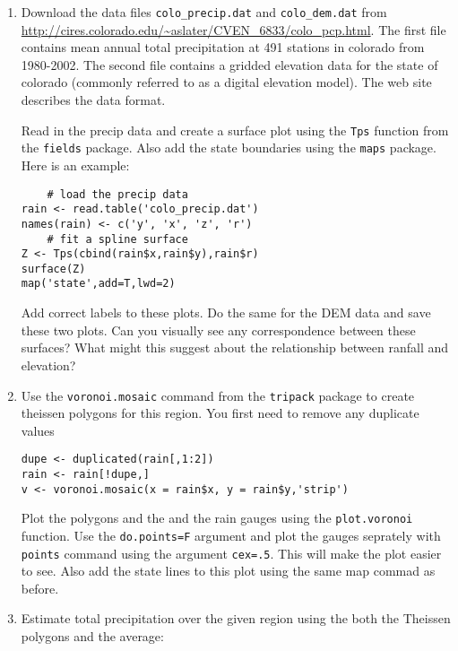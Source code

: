 \documentclass[11pt]{article}
\begin{document}
\begin{enumerate}

\item Download the data files \texttt{colo\_precip.dat} and \texttt{colo\_dem.dat} from \url{http://cires.colorado.edu/~aslater/CVEN\_6833/colo_pcp.html}.  The first file contains mean annual total precipitation at 491 stations in colorado from 1980-2002.  The second file contains a gridded elevation data for the state of colorado (commonly referred to as a digital elevation model). The web site describes the data format. 

Read in the precip data and create a surface plot using the \texttt{Tps} function from the \texttt{fields} package.  Also add the state boundaries using the \texttt{maps} package. Here is an example:

\begin{verbatim}
	# load the precip data
rain <- read.table('colo_precip.dat')
names(rain) <- c('y', 'x', 'z', 'r')
	# fit a spline surface
Z <- Tps(cbind(rain$x,rain$y),rain$r)
surface(Z)
map('state',add=T,lwd=2)
\end{verbatim}

Add correct labels to these plots.  Do the same for the DEM data and save these two plots. Can you visually see any correspondence between these surfaces?  What might this suggest about the relationship between ranfall and elevation?

\item  Use the \texttt{voronoi.mosaic} command from the \texttt{tripack} package to create theissen polygons for this region.  You first need to remove any duplicate values

\begin{verbatim}
dupe <- duplicated(rain[,1:2])
rain <- rain[!dupe,]
v <- voronoi.mosaic(x = rain$x, y = rain$y,'strip')
\end{verbatim}

Plot the polygons and the and the rain gauges using the \texttt{plot.voronoi} function.  Use the \texttt{do.points=F} argument and plot the gauges seprately with \texttt{points} command using the argument \texttt{cex=.5}.  This will make the plot easier to see. Also add the state lines to this plot using the same map commad as before. 

\item Estimate total precipitation over the given region using the both the Theissen polygons and the average:


\end{enumerate}
\end{document}

